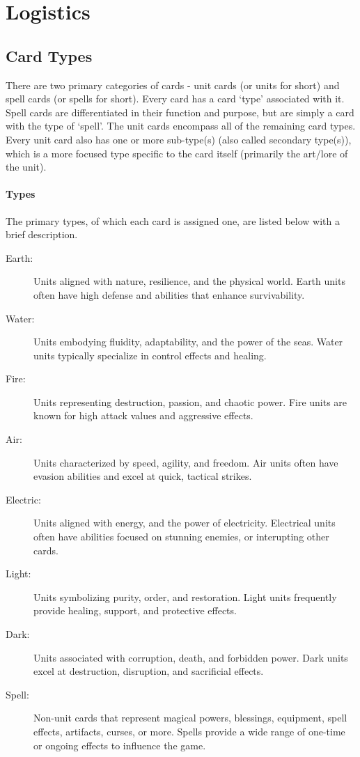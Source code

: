 \chapter{Logistics}





\section{Card Types}

There are two primary categories of cards - unit cards (or units for short) and spell cards (or spells for short). Every card has a card `type' associated with it. Spell cards are differentiated in their function and purpose, but are simply a card with the type of `spell'. The unit cards encompass all of the remaining card types. Every unit card also has one or more sub-type(s) (also called secondary type(s)), which is a more focused type specific to the card itself (primarily the art/lore of the unit).

\subsubsection{Types}
The primary types, of which each card is assigned one, are listed below with a brief description.
\begin{description}
  \item[Earth:] Units aligned with nature, resilience, and the physical world. Earth units often have high defense and abilities that enhance survivability.
  \item[Water:] Units embodying fluidity, adaptability, and the power of the seas. Water units typically specialize in control effects and healing.
  \item[Fire:] Units representing destruction, passion, and chaotic power. Fire units are known for high attack values and aggressive effects.
  \item[Air:] Units characterized by speed, agility, and freedom. Air units often have evasion abilities and excel at quick, tactical strikes.
  \item[Electric:] Units aligned with energy, and the power of electricity. Electrical units often have abilities focused on stunning enemies, or interupting other cards.
  \item[Light:] Units symbolizing purity, order, and restoration. Light units frequently provide healing, support, and protective effects.
  \item[Dark:] Units associated with corruption, death, and forbidden power. Dark units excel at destruction, disruption, and sacrificial effects.
  \item[Spell:] Non-unit cards that represent magical powers, blessings, equipment, spell effects, artifacts, curses, or more. Spells provide a wide range of one-time or ongoing effects to influence the game.
\end{description}

